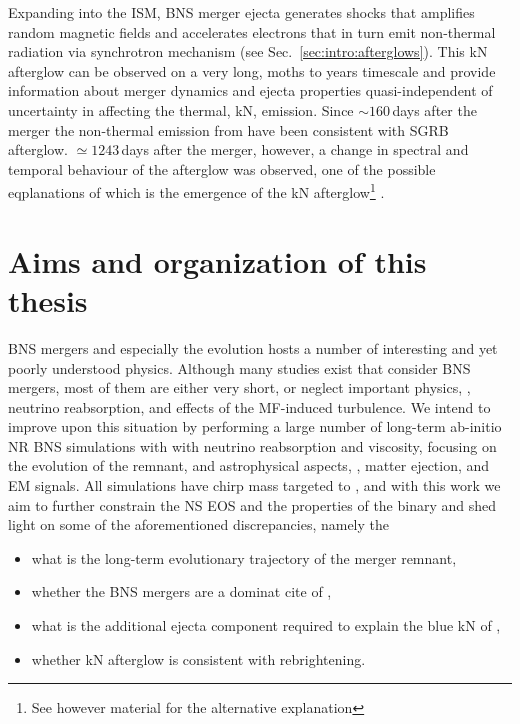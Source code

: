 Expanding into the \ac{ISM}, \ac{BNS} merger ejecta generates shocks that amplifies 
random magnetic fields and accelerates electrons that in turn emit non-thermal radiation 
via synchrotron mechanism (see Sec.~\ref{sec:intro:afterglows}). This \ac{kN} afterglow 
can be observed on a very long, 
moths to years timescale \cite{150,149} and provide information about merger dynamics and 
ejecta properties quasi-independent of uncertainty in \rproc{} \nuc{} affecting the 
thermal, \ac{kN}, emission. 
Since ${\sim160}\,$days after the merger the non-thermal emission from \GW{} have been 
consistent with \ac{SGRB} afterglow. ${\simeq}1243\,$days after the merger, however, a 
change in spectral and temporal behaviour of the afterglow was observed, one of the 
possible eqplanations of which is the emergence of the \ac{kN} afterglow\footnote{
    See however material \cite{Troja:2021xsw} for the alternative explanation
} \cite{Hajela:2021faz}.




\section{Aims and organization of this thesis}

\ac{BNS} mergers and especially the \pmerg{} evolution hosts a number of interesting 
and yet poorly understood physics. Although many studies exist that consider \ac{BNS} mergers, 
most of them are either very short, or neglect important physics, \eg, neutrino reabsorption, 
and effects of the \ac{MF}-induced turbulence. 
%
We intend to improve upon this situation by performing a large number of long-term ab-initio 
\ac{NR} \ac{BNS} simulations with with neutrino reabsorption and viscosity, focusing on the 
\pmerg{} evolution of the remnant, and astrophysical aspects, \ie, matter ejection, 
\rproc{} \nuc{} and \ac{EM} signals. 
%
All simulations have chirp mass targeted to \GW{}, and with this work we aim to further 
constrain the \ac{NS} \ac{EOS} and the properties of the binary and shed light on 
some of the aforementioned discrepancies, namely the 
\begin{itemize}
    \item what is the long-term evolutionary trajectory of the merger remnant,
    \item whether the \ac{BNS} mergers are a dominat cite of \rproc{}, 
    \item what is the additional ejecta component required to explain the blue \ac{kN} of \AT{}, 
    \item whether \ac{kN} afterglow is consistent with \GRB{} rebrightening.
\end{itemize}

